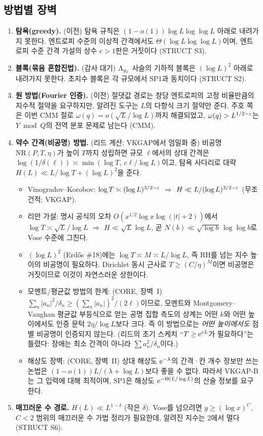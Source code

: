 \subsection{방법별 장벽}
\begin{enumerate}[leftmargin=1.6em,itemsep=3pt]
\item \textbf{탐욕(greedy).} \PROVED{} (이전) 탐욕 규칙은 $(1-o(1))\log L\log\log L$ 아래로 내려가지 못한다. 엔트로피 수준의 이상적 간격에서도 $\Theta(\log L\log\log L)$이며, 엔트로피 수준 간격 가설의 상수 $c>1$판은 거짓이다 (STRUCT S3).
\item \textbf{블록(묶음 혼합진법).} \PROVED{} (감사 대기) $\Lambda_{y_j}$ 사슬의 기하적 블록은 $(\log L)^2$ 아래로 내려가지 못한다. 초지수 블록은 각 규모에서 SP1과 동치이다 (STRUCT S2).
\item \textbf{원 방법(Fourier 인증).} \PROVED{} (이전) 절댓값 경로는 창당 엔트로피의 고정 비율만큼의 지수적 절약을 요구하지만, 알려진 도구는 $L$의 다항식 크기 절약만 준다. 주호 쪽은 이번 CMM 절로 $\omega(q)=o(\sqrt L/\log L)$까지 해결되었고, $\omega(q)>L^{1/2-\varepsilon}$는 $Y\bmod Q$의 전역 분포 문제로 남는다 (CMM).
\item \textbf{약수 간격(비공명) 방법.} \HEUR{} (리드 계산; VKGAP에서 엄밀화 중) 비공명 $\mathrm{NR}(P,T,\eta)$가 높이 $T$까지 성립하면 규모 $\ell$에서의 상대 간격은 $\log(1/\delta(\ell))\asymp\min(\log T,\ c\ell/\log L)$이고, 탐욕 사다리로 대략 $H(L)\ll L/\log T+(\log L)^2$을 준다.
 \begin{itemize}[leftmargin=1.2em]
 \item Vinogradov--Korobov: $\log T\asymp(\log L)^{3/2-\varepsilon}$ $\Rightarrow$ $H\ll L/(\log L)^{3/2-\varepsilon}$ (무조건적; VKGAP).
 \item 리만 가설: 명시 공식의 오차 $O(x^{1/2}\log x\log(|t|+2))$에서 $\log T\asymp\sqrt L/\log L$ $\Rightarrow$ $H\ll\sqrt L\log L$, 곧 $N(b)\ll\sqrt{\log b}\,\log\log b$로 Vose 수준에 그친다.
 \item $(\log L)^2$ (Erdős \#18)에는 $\log T\asymp M\asymp L/\log L$, 즉 RH를 넘는 지수 높이의 비공명이 필요하다. Dirichlet 동시 근사로 $T\ge(C/\eta)^M$이면 비공명은 거짓이므로 이것이 자연스러운 상한이다.
 \item 모멘트/평균값 방법의 한계: \PROVED{} (CORE, 장벽~I) $\sum_n|a_n|^2/\delta_n\ge(\sum_n|a_n|)^2/(2\ell)$이므로, 모멘트와 Montgomery--Vaughan 평균값 부등식으로 얻는 공명 집합 측도의 상계는 어떤 $k$와 어떤 높이에서도 인증 문턱 $2\eta/\log L$보다 크다. 즉 이 방법으로는 \emph{어떤 높이에서도} 점별 비공명이 인증되지 않는다. (리드의 초기 스케치 ``$T\ge\mathrm{e}^{cL}$가 필요하다''는 틀렸다: 장애는 최소 간격이 아니라 $\sum a_n^2/\delta_n$이다.)
 \item 해상도 장벽: \PROVED{} (CORE, 장벽~II) 상대 해상도 $\mathrm{e}^{-\lambda}$의 간격·칸 개수 정보만 쓰는 논법은 $(1-o(1))L/(\lambda+\log L)$보다 좋을 수 없다. 따라서 VKGAP-B는 그 입력에 대해 최적이며, SP1은 해상도 $\mathrm{e}^{-\Theta(L/\log L)}$의 산술 정보를 요구한다.
 \end{itemize}
\item \textbf{매끄러운 수 경로.}  $H(L)\ll L^{1-\delta}$ (작은 $\delta$). Vose를 넘으려면 $y\ge(\log x)^C$, $C<2$ 범위의 매끄러운 수 가법 정리가 필요한데, 알려진 지수는 $2$에서 멀다 (STRUCT S6).
\end{enumerate}


